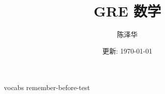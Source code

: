 \documentclass{report}
\title{GRE 数学}
\author{陈泽华}
\date{更新: \today}
\begin{document}
  \maketitle
  \tableofcontents

  {vocabs}
  {remember-before-test}
\end{document}
